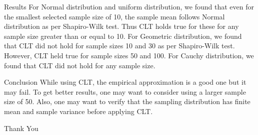 \documentclass{beamer}
\begin{document}
\begin{frame}{Results}
    For Normal distribution and uniform distribution, we found that even for the smallest selected sample size of 10, the sample mean follows Normal distribution as per Shapiro-Wilk test. Thus CLT holds true for these for any sample size greater than or equal to 10. For Geometric distribution, we found that CLT did not hold for sample sizes 10 and 30 as per Shapiro-Wilk test. However, CLT held true for sample sizes 50 and 100. For Cauchy distribution, we found that CLT did not hold for any sample size. 
\end{frame}


\begin{frame}{Conclusion}
    While using CLT, the empirical approximation is a good one but it may fail. To get better results, one may want to consider using a larger sample size of 50. Also, one may want to verify that the sampling distribution has finite mean and sample variance before applying CLT.
\end{frame}

\begin{frame}{}
\begin{center}
        \Huge{Thank You}
\end{center}
\end{frame}
\end{document}
